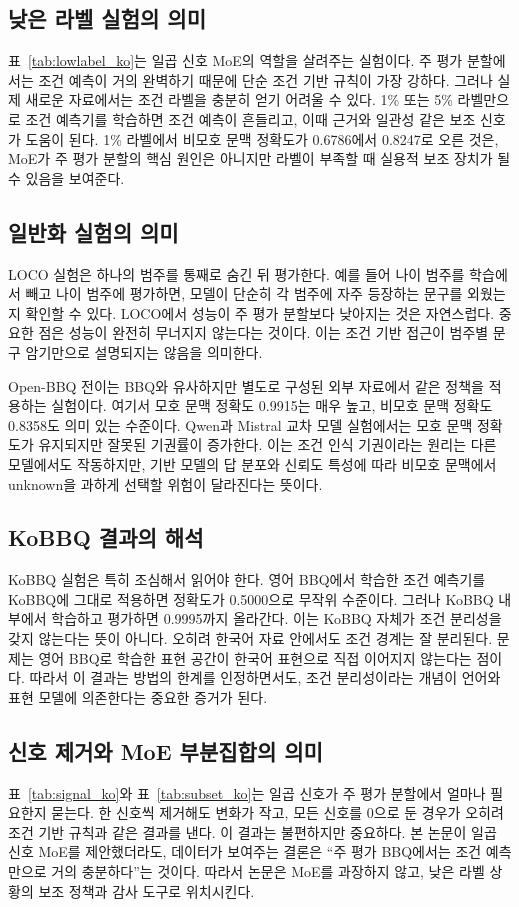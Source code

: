 \documentclass{ieeeaccess}
\begin{document}
\subsection{낮은 라벨 실험의 의미}
표~\ref{tab:lowlabel_ko}는 일곱 신호 MoE의 역할을 살려주는 실험이다. 주 평가 분할에서는 조건 예측이 거의 완벽하기 때문에 단순 조건 기반 규칙이 가장 강하다. 그러나 실제 새로운 자료에서는 조건 라벨을 충분히 얻기 어려울 수 있다. 1\% 또는 5\% 라벨만으로 조건 예측기를 학습하면 조건 예측이 흔들리고, 이때 근거와 일관성 같은 보조 신호가 도움이 된다. 1\% 라벨에서 비모호 문맥 정확도가 0.6786에서 0.8247로 오른 것은, MoE가 주 평가 분할의 핵심 원인은 아니지만 라벨이 부족할 때 실용적 보조 장치가 될 수 있음을 보여준다.

\subsection{일반화 실험의 의미}
LOCO 실험은 하나의 범주를 통째로 숨긴 뒤 평가한다. 예를 들어 나이 범주를 학습에서 빼고 나이 범주에 평가하면, 모델이 단순히 각 범주에 자주 등장하는 문구를 외웠는지 확인할 수 있다. LOCO에서 성능이 주 평가 분할보다 낮아지는 것은 자연스럽다. 중요한 점은 성능이 완전히 무너지지 않는다는 것이다. 이는 조건 기반 접근이 범주별 문구 암기만으로 설명되지는 않음을 의미한다.

Open-BBQ 전이는 BBQ와 유사하지만 별도로 구성된 외부 자료에서 같은 정책을 적용하는 실험이다. 여기서 모호 문맥 정확도 0.9915는 매우 높고, 비모호 문맥 정확도 0.8358도 의미 있는 수준이다. Qwen과 Mistral 교차 모델 실험에서는 모호 문맥 정확도가 유지되지만 잘못된 기권률이 증가한다. 이는 조건 인식 기권이라는 원리는 다른 모델에서도 작동하지만, 기반 모델의 답 분포와 신뢰도 특성에 따라 비모호 문맥에서 unknown을 과하게 선택할 위험이 달라진다는 뜻이다.

\subsection{KoBBQ 결과의 해석}
KoBBQ 실험은 특히 조심해서 읽어야 한다. 영어 BBQ에서 학습한 조건 예측기를 KoBBQ에 그대로 적용하면 정확도가 0.5000으로 무작위 수준이다. 그러나 KoBBQ 내부에서 학습하고 평가하면 0.9995까지 올라간다. 이는 KoBBQ 자체가 조건 분리성을 갖지 않는다는 뜻이 아니다. 오히려 한국어 자료 안에서도 조건 경계는 잘 분리된다. 문제는 영어 BBQ로 학습한 표현 공간이 한국어 표현으로 직접 이어지지 않는다는 점이다. 따라서 이 결과는 방법의 한계를 인정하면서도, 조건 분리성이라는 개념이 언어와 표현 모델에 의존한다는 중요한 증거가 된다.

\subsection{신호 제거와 MoE 부분집합의 의미}
표~\ref{tab:signal_ko}와 표~\ref{tab:subset_ko}는 일곱 신호가 주 평가 분할에서 얼마나 필요한지 묻는다. 한 신호씩 제거해도 변화가 작고, 모든 신호를 0으로 둔 경우가 오히려 조건 기반 규칙과 같은 결과를 낸다. 이 결과는 불편하지만 중요하다. 본 논문이 일곱 신호 MoE를 제안했더라도, 데이터가 보여주는 결론은 ``주 평가 BBQ에서는 조건 예측만으로 거의 충분하다''는 것이다. 따라서 논문은 MoE를 과장하지 않고, 낮은 라벨 상황의 보조 정책과 감사 도구로 위치시킨다.
\end{document}
